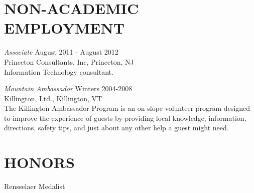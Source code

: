 \documentclass[line,overlapped]{res}
\begin{document}
\begin{resume}
                          
                          \section{NON-ACADEMIC\\EMPLOYMENT}             
                                  {\sl Associate} \hfill August 2011 - August 2012\\
                                  Princeton Consultants, Inc, Princeton, NJ\\
                                  Information Technology consultant.

                                  {\it Mountain Ambassador} \hfill Winters 2004-2008\\
                                  Killington, Ltd., Killington, VT \\
                                  The Killington Ambassador Program is an on-slope volunteer program
                                  designed to improve the experience of guests by providing local knowledge, 
                                  information, directions, safety tips, and just about any other help a guest might need.

%
                                  
                                  \section{HONORS}
                                  Rensselaer Medalist
                                  

\end{resume}
\end{document}
